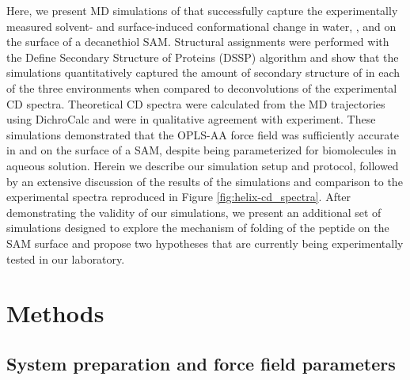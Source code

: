 Here, we present MD simulations of \pep{} that successfully capture the experimentally measured solvent- and surface-induced conformational change in water, \tbawat{}, and on the surface of a decanethiol SAM. 
Structural assignments were performed with the Define Secondary Structure of Proteins (DSSP) algorithm and show that the simulations quantitatively captured the amount of secondary structure of \pep{} in each of the three environments when compared to deconvolutions of the experimental CD spectra. 
Theoretical CD spectra were calculated from the MD trajectories using DichroCalc and were in qualitative agreement with experiment. 
These simulations demonstrated that the OPLS-AA force field was sufficiently accurate in \tbawat{} and on the surface of a SAM, despite being parameterized for biomolecules in aqueous solution. 
Herein we describe our simulation setup and protocol, followed by an extensive discussion of the results of the simulations and comparison to the experimental spectra\cite{Gallardo2012} reproduced in Figure \ref{fig:helix-cd_spectra}. 
After demonstrating the validity of our simulations, we present an additional set of simulations designed to explore the mechanism of folding of the peptide on the SAM surface and propose two hypotheses that are currently being experimentally tested in our laboratory.

\section{Methods}\label{helix-methods}

\subsection{System preparation and force field parameters}

